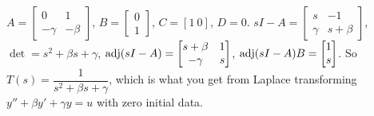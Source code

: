 \begin{workbox}[title={Worked example: the damped oscillator}]
$A=\begin{bmatrix}0&1\\-\gamma&-\beta\end{bmatrix}$, $B=\begin{bmatrix}0\\1\end{bmatrix}$, $C=[1\ 0]$, $D=0$.
$sI-A=\begin{bmatrix}s&-1\\\gamma&s+\beta\end{bmatrix}$, $\det=s^2+\beta s+\gamma$, $\operatorname{adj}(sI-A)=\begin{bmatrix}s+\beta&1\\-\gamma&s\end{bmatrix}$, $\operatorname{adj}(sI-A)B=\begin{bmatrix}1\\s\end{bmatrix}$.
So $T(s)=\dfrac{1}{s^2+\beta s+\gamma}$, which is what you get from Laplace transforming $y''+\beta y'+\gamma y=u$ with zero initial data.
\end{workbox}


